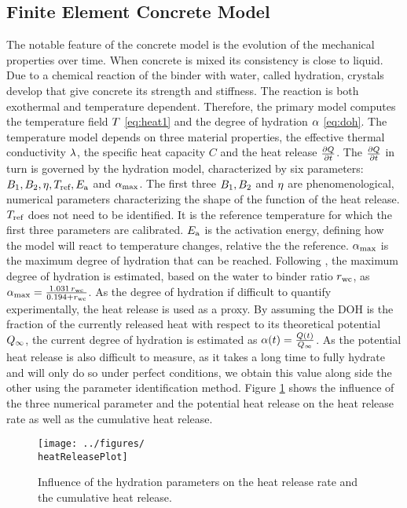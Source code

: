 \subsection{Finite Element Concrete Model}
The notable feature of the concrete model is the evolution of the mechanical properties over time.
When concrete is mixed its consistency is close to liquid.
Due to a chemical reaction of the binder with water, called hydration, crystals develop that give concrete its strength and stiffness.
The reaction is both exothermal and temperature dependent.
Therefore, the primary model computes the temperature field $T$ \eqref{eq:heat1} and the degree of hydration $\alpha$ \eqref{eq:doh}.
The temperature model depends on three material properties, the effective thermal conductivity $\lambda$, the specific heat capacity $C$ and the heat release $\frac{\partial Q}{\partial t}$.
The $\frac{\partial Q}{\partial t}$ in turn is governed by the hydration model, characterized by six parameters:
$B_1, B_2, \eta, T_{\text{ref}}, E_{\text{a}}$ and $\alpha_{\text{max}}$.
The first three $B_1, B_2$ and $\eta$ are phenomenological, numerical parameters characterizing the shape of the function of the heat release.
$T_{\text{ref}}$ does not need to be identified.
It is the reference temperature for which the first three parameters are calibrated.
$E_{\text{a}}$ is the activation energy, defining how the model will react to temperature changes, relative the the reference. 
$\alpha_{\text{max}}$ is the maximum degree of hydration that can be reached.
Following \cite{Mills1966fico}, the maximum degree of hydration is estimated, based on the water to binder ratio $r_{\text{wc}}$, as $\alpha_{\text{max}} = \frac{1.031\,r_{\text{wc}}}{0.194 + r_{\text{wc}}}$.
As the degree of hydration if difficult to quantify experimentally, the heat release is used as a proxy.
By assuming the DOH is the fraction of the currently released heat with respect to its theoretical potential $Q_{\infty}$, the current degree of hydration is estimated as $\alpha(t) = \frac{Q(t)}{Q_{\infty}}$.
As the potential heat release is also difficult to measure, as it takes a long time to fully hydrate and will only do so under perfect conditions, we obtain this value along side the other using the parameter identification method.
Figure \ref{fig:heatrelease} shows the influence of the three numerical parameter and the potential heat release on the heat release rate as well as the cumulative heat release.
\begin{figure}[h]%
	\centering
	\texttt{[image: ../figures/\\heatReleasePlot]}
	\caption{Influence of the hydration parameters on the heat release rate and the cumulative heat release.}\label{fig:heatrelease}
\end{figure}
